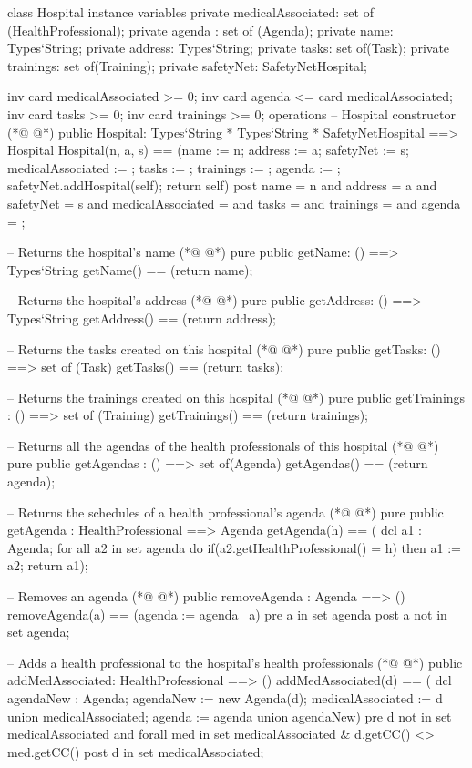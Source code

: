 \begin{vdmpp}[breaklines=true]
class Hospital
instance variables
  private medicalAssociated: set of (HealthProfessional);
  private agenda : set of (Agenda);
  private name: Types`String;
  private address: Types`String;
  private tasks: set of(Task);
  private trainings: set of(Training);
  private safetyNet: SafetyNetHospital;
 
 inv card medicalAssociated >= 0;
 inv card agenda <= card medicalAssociated;
 inv card tasks >= 0;
 inv card trainings >= 0;
operations
 -- Hospital constructor
(*@
\label{Hospital:17}
@*)
 public Hospital: Types`String * Types`String * SafetyNetHospital ==> Hospital
  Hospital(n, a, s) == (name := n; address := a; safetyNet := s; medicalAssociated := {}; tasks := {}; trainings := {}; agenda := {};
  safetyNet.addHospital(self); return self)
 post name = n and address = a and safetyNet = s and medicalAssociated = {} and tasks = {} and trainings = {} and agenda = {};
 
 -- Returns the hospital's name
(*@
\label{getName:23}
@*)
 pure public getName: () ==> Types`String
  getName() == (return name);
  
 -- Returns the hospital's address
(*@
\label{getAddress:27}
@*)
 pure public getAddress: () ==> Types`String
  getAddress() == (return address);
 
 -- Returns the tasks created on this hospital
(*@
\label{getTasks:31}
@*)
 pure public getTasks: () ==> set of (Task)
  getTasks() == (return tasks);
 
 -- Returns the trainings created on this hospital
(*@
\label{getTrainings:35}
@*)
 pure public getTrainings : () ==> set of (Training)
  getTrainings() == (return trainings);
 
 -- Returns all the agendas of the health professionals of this hospital
(*@
\label{getAgendas:39}
@*)
 pure public getAgendas : () ==> set of(Agenda)
  getAgendas() == (return agenda);
 
 -- Returns the schedules of a health professional's agenda
(*@
\label{getAgenda:43}
@*)
 pure public getAgenda : HealthProfessional ==> Agenda
  getAgenda(h) == (
   dcl a1 : Agenda;
   for all a2 in set agenda do
    if(a2.getHealthProfessional() = h)
     then a1 := a2;
   return a1);
 
 -- Removes an agenda
(*@
\label{removeAgenda:52}
@*)
 public removeAgenda : Agenda ==> ()
  removeAgenda(a) == (agenda := agenda \ {a})
 pre a in set agenda
 post a not in set agenda;
 
 -- Adds a health professional to the hospital's health professionals
(*@
\label{addMedAssociated:58}
@*)
 public addMedAssociated: HealthProfessional ==> ()
  addMedAssociated(d) == (
   dcl agendaNew : Agenda;
   agendaNew := new Agenda(d);
   medicalAssociated := {d} union medicalAssociated;
   agenda := agenda union {agendaNew})
 pre d not in set medicalAssociated and forall med in set medicalAssociated & d.getCC() <> med.getCC()
 post d in set medicalAssociated;
 

\end{vdmpp}
